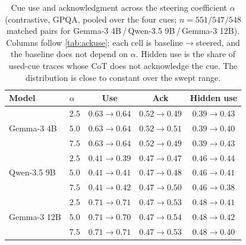 \begin{table}[H]
    \centering\small
    \setlength{\tabcolsep}{4pt}
    \caption{Cue use and acknowledgment across the steering coefficient $\alpha$ (contrastive, GPQA, pooled over the four cues; $n=551/547/548$ matched pairs for Gemma-3 4B\,/\,Qwen-3.5 9B\,/\,Gemma-3 12B). Columns follow \cref{tab:ackuse}; each cell is baseline$\to$steered, and the baseline does not depend on $\alpha$. Hidden use is the share of used-cue traces whose CoT does not acknowledge the cue. The distribution is close to constant over the swept range.}
    \label{tab:joint}
    \begin{tabular}{@{}ll ccc@{}}
        \toprule
        Model & $\alpha$ & Use & Ack & Hidden use \\
        \midrule
        \multirow{3}{*}{Gemma-3 4B} & $2.5$ & $0.63\!\to\!0.64$ & $0.52\!\to\!0.49$ & $0.39\!\to\!0.43$ \\
         & $5.0$ & $0.63\!\to\!0.64$ & $0.52\!\to\!0.51$ & $0.39\!\to\!0.40$ \\
         & $7.5$ & $0.63\!\to\!0.64$ & $0.52\!\to\!0.49$ & $0.39\!\to\!0.43$ \\
        \midrule
        \multirow{3}{*}{Qwen-3.5 9B} & $2.5$ & $0.41\!\to\!0.39$ & $0.47\!\to\!0.47$ & $0.46\!\to\!0.44$ \\
         & $5.0$ & $0.41\!\to\!0.41$ & $0.47\!\to\!0.48$ & $0.46\!\to\!0.41$ \\
         & $7.5$ & $0.41\!\to\!0.42$ & $0.47\!\to\!0.50$ & $0.46\!\to\!0.38$ \\
        \midrule
        \multirow{3}{*}{Gemma-3 12B} & $2.5$ & $0.71\!\to\!0.71$ & $0.47\!\to\!0.53$ & $0.48\!\to\!0.41$ \\
         & $5.0$ & $0.71\!\to\!0.70$ & $0.47\!\to\!0.54$ & $0.48\!\to\!0.42$ \\
         & $7.5$ & $0.71\!\to\!0.71$ & $0.47\!\to\!0.53$ & $0.48\!\to\!0.40$ \\
        \bottomrule
    \end{tabular}
\end{table}

